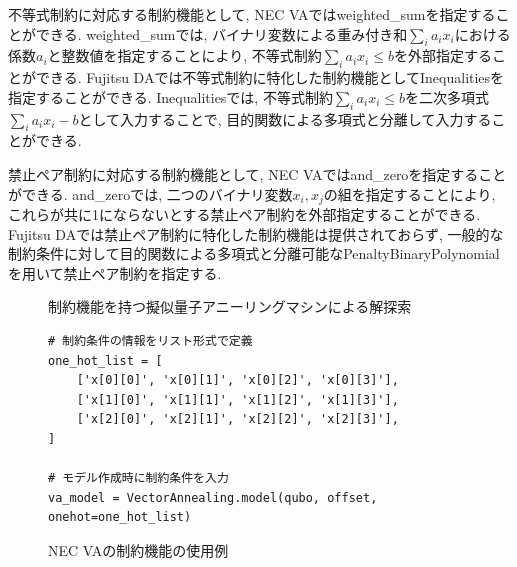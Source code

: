 \documentclass[submit,techrep,noauthor]{ipsj}
\newcounter{sourcecodefigure}
\newcounter{normalfigure}
\newcommand{\switchtosourcecode}{%
    \setcounter{normalfigure}{\value{figure}}
    \setcounter{figure}{\value{sourcecodefigure}}
}
\newcommand{\switchtonormal}{%
    \setcounter{sourcecodefigure}{\value{figure}}
    \setcounter{figure}{\value{normalfigure}}
}
\newcommand\sourcecodeposition{h}
\newenvironment{sourcecode}[1][h]{%
    \begin{figure}[#1]
    \renewcommand\sourcecodeposition{#1}
    \centering
    \captionsetup{name=ソースコード}
    \switchtosourcecode
    \ifthenelse{\equal{\sourcecodeposition}{t}}%
        {\vspace{-1.3zh}} %
        {\ifthenelse{\equal{\sourcecodeposition}{b}}%
            {\vspace{-2zh}} %
            {\vspace{-2zh}} %
    }
}{%
    \ifthenelse{\equal{\sourcecodeposition}{t}}%
        {\vspace{-1.3zh}} %
        {\ifthenelse{\equal{\sourcecodeposition}{b}}%
            {\vspace{-1zh}} %
            {\vspace{-3zh}} %
    }
    \switchtonormal
    \end{figure}
}
\begin{document}
不等式制約に対応する制約機能として, NEC VAではweighted\_sumを指定することができる. weighted\_sumでは, バイナリ変数による重み付き和$\sum_{i}a_{i}x_{i}$における係数$a_{i}$と整数値を指定することにより, 不等式制約$\sum_{i}a_{i}x_{i}\le b$を外部指定することができる. Fujitsu DAでは不等式制約に特化した制約機能としてInequalitiesを指定することができる. Inequalitiesでは, 不等式制約$\sum_{i}a_{i}x_{i}\le b$を二次多項式$\sum_{i}a_{i}x_{i}-b$として入力することで, 目的関数による多項式と分離して入力することができる.

禁止ペア制約に対応する制約機能として, NEC VAではand\_zeroを指定することができる. and\_zeroでは, 二つのバイナリ変数$x_{i}, x_{j}$の組を指定することにより, これらが共に1にならないとする禁止ペア制約を外部指定することができる. Fujitsu DAでは禁止ペア制約に特化した制約機能は提供されておらず, 一般的な制約条件に対して目的関数による多項式と分離可能なPenaltyBinaryPolynomialを用いて禁止ペア制約を指定する. 


\begin{figure}[ht]
\centering
{}
\hspace{5mm}
\caption{制約機能を持つ擬似量子アニーリングマシンによる解探索}
\label{va_search}
\end{figure}

\begin{sourcecode}[h] %
\caption{NEC VAの制約機能の使用例}\label{code:nec_va}
\begin{lstlisting}
# 制約条件の情報をリスト形式で定義
one_hot_list = [
    ['x[0][0]', 'x[0][1]', 'x[0][2]', 'x[0][3]'],
    ['x[1][0]', 'x[1][1]', 'x[1][2]', 'x[1][3]'],
    ['x[2][0]', 'x[2][1]', 'x[2][2]', 'x[2][3]'],
]

# モデル作成時に制約条件を入力
va_model = VectorAnnealing.model(qubo, offset, onehot=one_hot_list)
\end{lstlisting}
\vspace{3mm}
\end{sourcecode}
\end{document}
